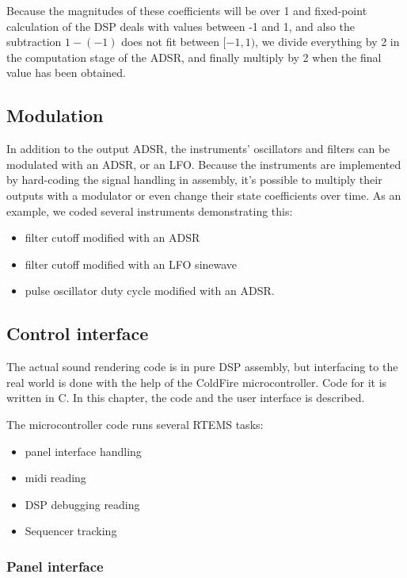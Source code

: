 \documentclass[10pt,a4paper,oneside]{article}
\begin{document}
Because the magnitudes of these coefficients will be over 1 and fixed-point calculation of the DSP deals with values between -1 and 1, and also the subtraction $1-(-1)$ does not fit between $[-1,1)$, we divide everything by 2 in the computation stage of the ADSR, and finally multiply by 2 when the final value has been obtained.


\subsection{Modulation}

In addition to the output ADSR, the instruments' oscillators and filters can be modulated with an ADSR, or an LFO. Because the instruments are implemented by hard-coding the signal handling in assembly, it's possible to multiply their outputs with a modulator or even change their state coefficients over time. As an example, we coded several instruments demonstrating this:

\begin{itemize}
	\item filter cutoff modified with an ADSR
	\item filter cutoff modified with an LFO sinewave
	\item pulse oscillator duty cycle modified with an ADSR.
\end{itemize}


\subsection{Control interface}

The actual sound rendering code is in pure DSP assembly, but interfacing to the real world is done with the help of the ColdFire microcontroller. Code for it is written in C. In this chapter, the code and the user interface is described.

The microcontroller code runs several RTEMS tasks:

\begin{itemize}
	\item panel interface handling
	\item midi reading
	\item DSP debugging reading
	\item Sequencer tracking
\end{itemize}


\subsubsection{Panel interface}
\end{document}
